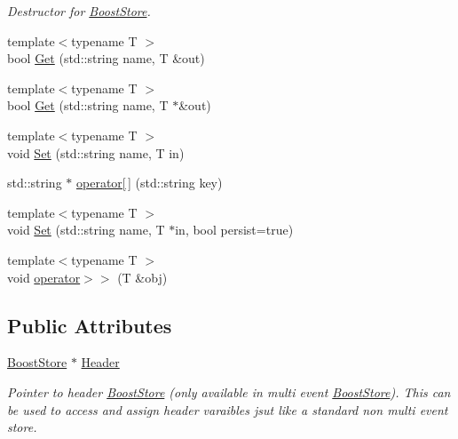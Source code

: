 \begin{DoxyCompactItemize}
\begin{DoxyCompactList}\small\item\em Destructor for \hyperlink{classBoostStore}{Boost\-Store}. \end{DoxyCompactList}\item 
{\footnotesize template$<$typename T $>$ }\\bool \hyperlink{classBoostStore_aaf269e40778672ed68224377b5e90fa9}{Get} (std\-::string name, T \&out)
\item 
{\footnotesize template$<$typename T $>$ }\\bool \hyperlink{classBoostStore_a7e2496fd31eed43a84eea9563ecf7f86}{Get} (std\-::string name, T $\ast$\&out)
\item 
{\footnotesize template$<$typename T $>$ }\\void \hyperlink{classBoostStore_a94e4f0b1d996488538efc09b831cd1a6}{Set} (std\-::string name, T in)
\item 
std\-::string $\ast$ \hyperlink{classBoostStore_aca2c7aed9a33e4022bb18c887d9dc42c}{operator\mbox{[}$\,$\mbox{]}} (std\-::string key)
\item 
{\footnotesize template$<$typename T $>$ }\\void \hyperlink{classBoostStore_a198a7f41e16912b439b85523f802ad0f}{Set} (std\-::string name, T $\ast$in, bool persist=true)
\item 
{\footnotesize template$<$typename T $>$ }\\void \hyperlink{classBoostStore_a4f1bce161785c396eb407adf3ab4491e}{operator$>$$>$} (T \&obj)
\end{DoxyCompactItemize}
\subsection*{Public Attributes}
\begin{DoxyCompactItemize}
\item 
\hypertarget{classBoostStore_a3bfb8ffc972b7f0318b17018eaa37af2}{\hyperlink{classBoostStore}{Boost\-Store} $\ast$ \hyperlink{classBoostStore_a3bfb8ffc972b7f0318b17018eaa37af2}{Header}}\label{classBoostStore_a3bfb8ffc972b7f0318b17018eaa37af2}

\begin{DoxyCompactList}\small\item\em Pointer to header \hyperlink{classBoostStore}{Boost\-Store} (only available in multi event \hyperlink{classBoostStore}{Boost\-Store}). This can be used to access and assign header varaibles jsut like a standard non multi event store. \end{DoxyCompactList}\end{DoxyCompactItemize}
